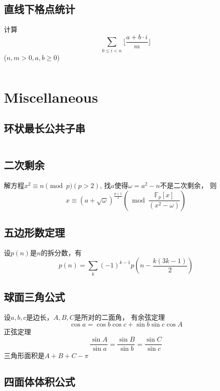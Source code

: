 \documentclass[a4paper]{article}
\newcommand{\cppcode}[1]{
    \inputminted[mathescape]{cpp}{source/#1}
}
\begin{document}
\subsection{直线下格点统计}

计算$$\sum_{0 \leq i < n} \lfloor \frac{a + b \cdot i}{m} \rfloor$$
($n, m > 0, a, b \geq 0$)
\cppcode{lattice-count.cpp}

\section{Miscellaneous}

\subsection{环状最长公共子串}

\cppcode{cyclic-longest-common-string.cpp}

\subsection{二次剩余}

解方程$x^2 \equiv n \pmod p (p > 2)$, 
找$a$使得$\omega = a^2 - n$不是二次剩余，
则$$x \equiv (a + \sqrt{\omega})^{\frac{p + 1}{2}} \left(\bmod \frac{\mathbb{F}_p[x]}{(x^2 - \omega)}\right)$$

\subsection{五边形数定理}

设$p(n)$是$n$的拆分数，有$$p(n) = \sum_{k} (-1)^{k - 1} p\left(n - \frac{k(3k - 1)}{2}\right)$$

\subsection{球面三角公式}

设$a, b, c$是边长，$A, B, C$是所对的二面角，
有余弦定理$$\cos a = \cos b \cos c + \sin b \sin c \cos A$$
正弦定理$$\frac{\sin A}{\sin a} = \frac{\sin B}{\sin b} = \frac{\sin C}{\sin c}$$
三角形面积是$A + B + C - \pi$


\subsection{四面体体积公式}
\end{document}
